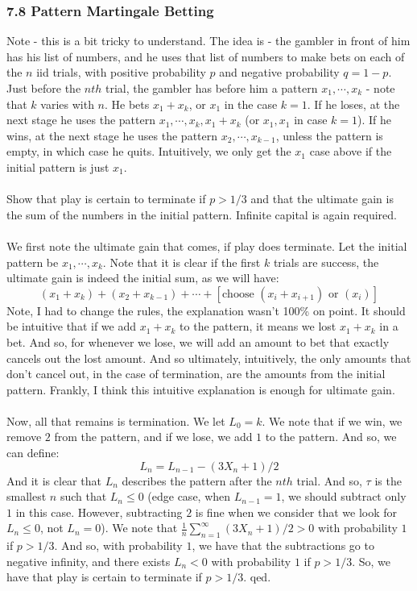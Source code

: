 \documentclass[12pt,a4paper]{article}
\newcommand{\1}[1]{\mathbbm{1}\left\{ #1 \right\}}
\begin{document}
\subsubsection{7.8 Pattern Martingale Betting} Note - this is a bit tricky to understand. The idea is - the gambler in front of him has his list of numbers, and he uses that list of numbers to make bets on each of the $n$ iid trials, with positive probability $p$ and negative probability $q = 1 - p$. Just before the $nth$ trial, the gambler has before him a pattern $x_1, \cdots, x_k$ - note that $k$ varies with $n$. He bets $x_1 + x_k$, or $x_1$ in the case $k = 1$. If he loses, at the next stage he uses the pattern $x_1, \cdots, x_k, x_1 + x_k$ (or $x_1,x_1$ in case $k = 1$). If he wins, at the next stage he uses the pattern $x_2, \cdots, x_{k-1}$, unless the pattern is empty, in which case he quits. Intuitively, we only get the $x_1$ case above if the initial pattern is just $x_1$. 
\\\\
Show that play is certain to terminate if $p > 1/3$ and that the ultimate gain is the sum of the numbers in the initial pattern. Infinite capital is again required.
\\\\
We first note the ultimate gain that comes, if play does terminate. Let the initial pattern be $x_1, \cdots, x_k$. Note that it is clear if the first $k$ trials are success, the ultimate gain is indeed the initial sum, as we will have:
$$
	(x_1 + x_k) + (x_2 + x_{k-1}) + \cdots + \left[\text{choose } (x_i + x_{i + 1}) \text{ or } (x_i)\right] 
$$
Note, I had to change the rules, the explanation wasn't 100\% on point. It should be intuitive that if we add $x_1 + x_k$ to the pattern, it means we lost $x_1 + x_k$ in a bet. And so, for whenever we lose, we will add an amount to bet that exactly cancels out the lost amount. And so ultimately, intuitively, the only amounts that don't cancel out, in the case of termination, are the amounts from the initial pattern. Frankly, I think this intuitive explanation is enough for ultimate gain.
\\\\
Now, all that remains is termination. We let $L_0 = k$. We note that if we win, we remove $2$ from the pattern, and if we lose, we add $1$ to the pattern. And so, we can define:
$$
	L_n = L_{n - 1} - \left(3X_n + 1\right) / 2
$$
And it is clear that $L_n$ describes the pattern after the $nth$ trial. And so, $\tau$ is the smallest $n$ such that $L_n \leq 0$ (edge case, when $L_{n - 1} = 1$, we should subtract only $1$ in this case. However, subtracting $2$ is fine when we consider that we look for $L_n \leq 0$, not $L_n = 0$). We note that $\frac{1}{n}\sum_{n=1}^\infty \left(3X_n + 1\right)/2 > 0$ with probability $1$ if $p > 1/3$. And so, with probability $1$, we have that the subtractions go to negative infinity, and there exists $L_n < 0$ with probability $1$ if $p > 1/3$. So, we have that play is certain to terminate if $p > 1/3$. qed.
\end{document}
